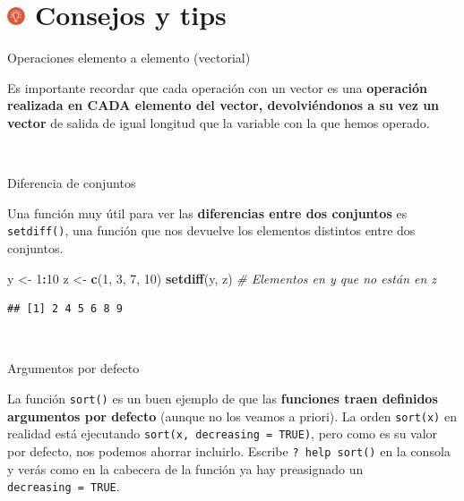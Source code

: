 \documentclass[11pt,]{book}
\newenvironment{Shaded}{\begin{snugshade}}{\end{snugshade}}
\newcommand{\CommentTok}[1]{\textcolor[rgb]{0.37,0.37,0.37}{\textit{#1}}}
\newcommand{\DecValTok}[1]{\textcolor[rgb]{0.06,0.06,0.06}{#1}}
\newcommand{\KeywordTok}[1]{\textcolor[rgb]{0.27,0.27,0.27}{\textbf{#1}}}
\newcommand{\NormalTok}[1]{#1}
\newcommand{\OperatorTok}[1]{\textcolor[rgb]{0.43,0.43,0.43}{\textbf{#1}}}
\newcommand{\StringTok}[1]{\textcolor[rgb]{0.5,0.5,0.5}{#1}}
\begin{document}
\hypertarget{consejos-y-tips-2}{%
\section[ Consejos y tips]{\texorpdfstring{\protect\includegraphics[width=0.04\textwidth,height=\textheight]{img/logo_info.png} Consejos y tips}{ Consejos y tips}}\label{consejos-y-tips-2}}

Operaciones elemento a elemento (vectorial)

Es importante recordar que cada operación con un vector es una \textbf{operación realizada en CADA elemento del vector, devolviéndonos a su vez un vector} de salida de igual longitud que la variable con la que hemos operado.

~

Diferencia de conjuntos

Una función muy útil para ver las \textbf{diferencias entre dos conjuntos} es \texttt{setdiff()}, una función que nos devuelve los elementos distintos entre dos conjuntos.

\begin{Shaded}
\begin{Highlighting}[]
\NormalTok{y <-}\StringTok{ }\DecValTok{1}\OperatorTok{:}\DecValTok{10}
\NormalTok{z <-}\StringTok{ }\KeywordTok{c}\NormalTok{(}\DecValTok{1}\NormalTok{, }\DecValTok{3}\NormalTok{, }\DecValTok{7}\NormalTok{, }\DecValTok{10}\NormalTok{)}
\KeywordTok{setdiff}\NormalTok{(y, z) }\CommentTok{# Elementos en y que no están en z }
\end{Highlighting}
\end{Shaded}

\begin{verbatim}
## [1] 2 4 5 6 8 9
\end{verbatim}

~

Argumentos por defecto

La función \texttt{sort()} es un buen ejemplo de que las \textbf{funciones traen definidos argumentos por defecto} (aunque no los veamos a priori). La orden \texttt{sort(x)} en realidad está ejecutando \texttt{sort(x,\ decreasing\ =\ TRUE)}, pero como es su valor por defecto, nos podemos ahorrar incluirlo. Escribe \texttt{?\ help\ sort()} en la consola y verás como en la cabecera de la función ya hay preasignado un \texttt{decreasing\ =\ TRUE}.

~
\end{document}
